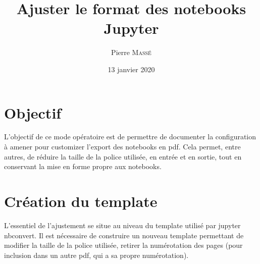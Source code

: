 \documentclass{article}
\title{Ajuster le format des notebooks Jupyter}
\author{Pierre \textsc{Massé}}
\date{13 janvier 2020}
\begin{document}
\maketitle

\section{Objectif}

L'objectif de ce mode opératoire est de permettre de documenter la configuration à amener pour customizer l'export des notebooks en pdf.
Cela permet, entre autres, de réduire la taille de la police utilisée, en entrée et en sortie, tout en conservant la mise en forme propre aux notebooks.

\section{Création du template}

L'essentiel de l'ajustement se situe au niveau du template utilisé par jupyter nbconvert.
Il est nécessaire de construire un nouveau template permettant de modifier la taille de la police utilisée, retirer la numérotation des pages (pour inclusion dans un autre pdf, qui a sa propre numérotation).

\small
{}
\normalsize
\end{document}
